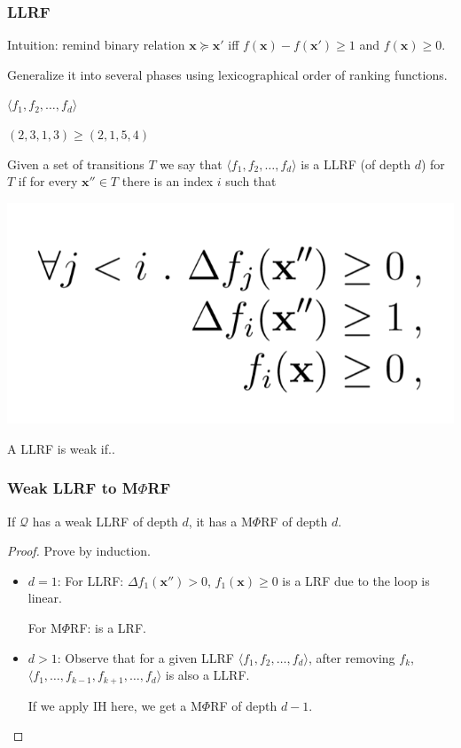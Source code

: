 \documentclass[11pt]{beamer}
\begin{document}
\iffalse
\begin{frame}\frametitle{LLRF}

Intuition: remind binary relation $\textbf{x} \succeq \textbf{x}'$ iff  $f(\textbf{x}) - f(\textbf{x}') \ge 1$ and $f(\textbf{x}) \ge 0$.

Generalize it into several phases using lexicographical order of ranking functions.

$\langle f_1, f_2, \ldots, f_d\rangle$

$(2,3,1,3) \ge (2,1,5,4)$

\begin{definition}[LLRF]
Given a set of transitions $T$ we say that 
$\langle f_1, f_2, \ldots, f_d\rangle$ is a LLRF (of depth $d$) for $T$ if for every $\textbf{x}''\in T$ there is an index $i$ such that 
\begin{center}
\includegraphics[scale = 0.26]{4.PNG}

\end{center}
A LLRF is weak if..
\end{definition}

\end{frame}

\begin{frame}\frametitle{Weak LLRF to M$\Phi$RF}

\begin{theorem}[3]
If $\mathcal{Q}$ has a weak LLRF of depth $d$, it has a  M$\Phi$RF of depth $d$.


\end{theorem}

\begin{proof}
Prove by induction.

\begin{itemize}

\item $d = 1$: 
For LLRF: $\Delta f_1(\textbf{x}'') > 0$, $f_1(\textbf{x}) \ge 0$ is a LRF due to the loop is linear.

For M$\Phi$RF: is a LRF.

\item $d > 1$: Observe that for a given LLRF $\langle f_1, f_2, \ldots, f_d\rangle $, after removing $f_k$, $\langle f_1, \ldots, f_{k-1}, f_{k+1}, \ldots, f_d\rangle$ is also a LLRF.

If we apply IH here, we get a M$\Phi$RF of depth $d-1$.

\end{itemize}


\end{proof}


\end{frame}
\end{document}
